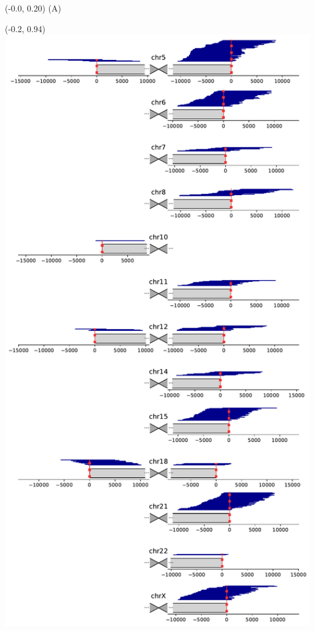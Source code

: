 \documentclass{article}
\begin{document}
\begin{textblock}{13}(-0.0,  0.20) \Huge{(A)} \end{textblock}
\begin{textblock}{13}(-0.2,  0.94) \includegraphics{assets/HG001-alignment.pdf}   \end{textblock}
\end{document}
